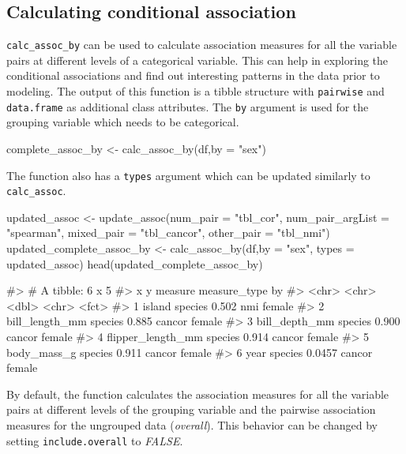 \hypertarget{calculating-conditional-association}{%
\subsection{Calculating conditional
association}\label{calculating-conditional-association}}

\texttt{calc\_assoc\_by} can be used to calculate association measures
for all the variable pairs at different levels of a categorical
variable. This can help in exploring the conditional associations and
find out interesting patterns in the data prior to modeling. The output
of this function is a tibble structure with \texttt{pairwise} and
\texttt{data.frame} as additional class attributes. The \texttt{by}
argument is used for the grouping variable which needs to be
categorical.

\begin{Schunk}
\begin{Sinput}
complete_assoc_by <- calc_assoc_by(df,by = "sex")
\end{Sinput}
\end{Schunk}

The function also has a \texttt{types} argument which can be updated
similarly to \texttt{calc\_assoc}.

\begin{Schunk}
\begin{Sinput}
updated_assoc <- update_assoc(num_pair = "tbl_cor",
                              num_pair_argList = "spearman",
                              mixed_pair = "tbl_cancor",
                              other_pair = "tbl_nmi")
updated_complete_assoc_by <- calc_assoc_by(df,by = "sex", types = updated_assoc)
head(updated_complete_assoc_by)
\end{Sinput}
\begin{Soutput}
#> # A tibble: 6 x 5
#>   x                 y       measure measure_type by    
#>   <chr>             <chr>     <dbl> <chr>        <fct> 
#> 1 island            species  0.502  nmi          female
#> 2 bill_length_mm    species  0.885  cancor       female
#> 3 bill_depth_mm     species  0.900  cancor       female
#> 4 flipper_length_mm species  0.914  cancor       female
#> 5 body_mass_g       species  0.911  cancor       female
#> 6 year              species  0.0457 cancor       female
\end{Soutput}
\end{Schunk}

By default, the function calculates the association measures for all the
variable pairs at different levels of the grouping variable and the
pairwise association measures for the ungrouped data (\emph{overall}).
This behavior can be changed by setting \texttt{include.overall} to
\emph{FALSE}.

